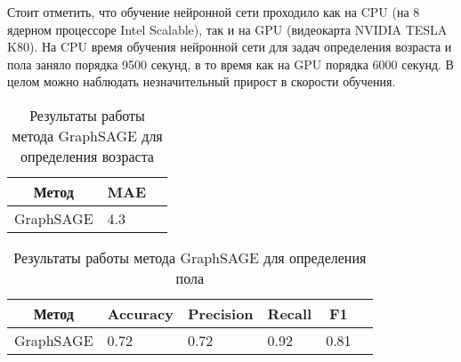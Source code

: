 Стоит отметить, что обучение нейронной сети проходило как на CPU (на  8 ядерном процессоре Intel Scalable), так и на GPU (видеокарта NVIDIA TESLA K80). На CPU время обучения нейронной сети для задач определения возраста и пола заняло порядка 9500 секунд, в то время как на GPU  порядка 6000 секунд.   В целом можно наблюдать незначительный прирост в скорости обучения.

\begin{table}[t]
\centering
\begin{tabular}{|l|l|l|}
\hline
\multicolumn{1}{|c|}{\textbf{Метод}} & \multicolumn{1}{c|}{\textbf{MAE}}  \\ \hline
GraphSAGE                        &               4.3                                                              \\ \hline
\end{tabular}
\caption{Результаты работы метода GraphSAGE для определения возраста}
\label{graphsage age table}
\end{table}

\begin{table}[t]
\centering
\begin{tabular}{|l|l|l|l|l|l|}
\hline
\multicolumn{1}{|c|}{\textbf{Метод}} & \multicolumn{1}{c|}{\textbf{Accuracy}} & \multicolumn{1}{c|}{\textbf{Precision}} & \multicolumn{1}{c|}{\textbf{Recall}} & \multicolumn{1}{c|}{\textbf{F1}}  \\ \hline
GraphSAGE                       & 0.72                                        &           0.72                              &      0.92                                &     0.81                          \\ \hline

\end{tabular}
\caption{Результаты работы метода GraphSAGE для определения пола}
\label{graphsage gender table}
\end{table}




\clearpage